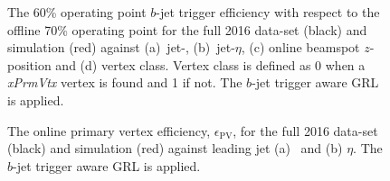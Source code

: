 \begin{figure}[!ht]
\begin{center}
  \end{center}
\vspace{-1em}
\caption[
  The $b$-jet trigger efficiency for the full 2016 data-set and simulation.
  The $b$-jet trigger aware GRL is applied.
]
        {The 60\% operating point $b$-jet trigger efficiency with respect to the offline 70\% operating point
    for the full 2016 data-set (black) and simulation (red) against (a)~jet-\pT{}, (b)~jet-$\eta$, (c) online beamspot $z$-position and (d) vertex class.
    Vertex class is defined as 0 when a \textit{xPrmVtx} vertex is found and 1 if not.
    The $b$-jet trigger aware GRL is applied.
}
  \label{fig:Full_bslt2mm_eff}
\end{figure}

\begin{figure}[!ht]
  \begin{center}
    \captionsetup[subfigure]{aboveskip=0pt,justification=centering}
    \hspace{-0.5cm}
  \end{center}
\vspace{-1em}
\caption[
  The online primary vertex efficiency for the full 2016 data-set and for simulation.
  The $b$-jet trigger aware GRL is applied.
]
        {
  The online primary vertex efficiency, $\epsilon_{\text{PV}}$, for the full 2016 data-set (black) and simulation (red) against leading jet (a) \pT~and (b) $\eta$.
  The $b$-jet trigger aware GRL is applied.}
  \label{fig:Full_bslt2mm_bperf}
\end{figure}

